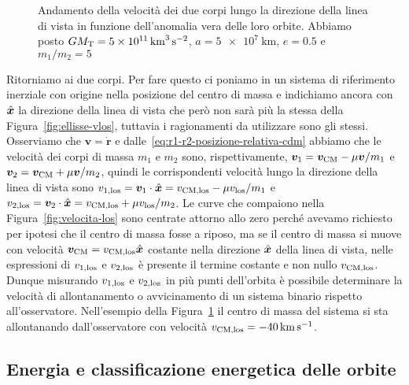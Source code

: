 {\begin{figure}
  \centering
  
  \caption[Andamento della velocità dei due corpi nella direzione della di vista
  in funzione dell'anomalia
  vera]{Andamento della velocità dei due corpi lungo la direzione della linea di
    vista in funzione dell'anomalia vera delle loro orbite. Abbiamo posto
    $GM_\textup{T} = \SI{5e11}{\cubic\kilo\metre\per\square\second}$,
    $a = \SI{5e7}{\kilo\metre}$, $e=0.5$ e $m_1/m_2=5$}
  \label{fig:velocita-los-due-corpi}
\end{figure}
Ritorniamo ai due corpi. Per fare questo ci poniamo in un sistema di riferimento
inerziale con origine nella posizione del centro di massa e indichiamo ancora
con $\hat{\bm{x}}$ la direzione della linea di vista che però non sarà più la
stessa della Figura~\ref{fig:ellisse-vlos}, tuttavia i ragionamenti da
utilizzare sono gli stessi. Osserviamo che $\bm{v}=\dot{\bm{r}}$ e
dalle~\eqref{eq:r1-r2-posizione-relativa-cdm} abbiamo che le velocità dei corpi
di massa $m_1$ e $m_2$ sono, rispettivamente,
$\bm{v}_1 = \bm{v}_\textup{CM}-\mu\bm{v}/m_1$ e
$\bm{v}_2 = \bm{v}_\textup{CM} + \mu\bm{v}/m_2$, quindi le corrispondenti
velocità lungo la direzione della linea di vista sono
$v_{1,\textup{los}} = \bm{v}_1 \cdot \hat{\bm{x}} = v_\textup{CM,los}-\mu
v_\textup{los}/m_1$
e
$v_{2,\textup{los}} = \bm{v}_2 \cdot \hat{\bm{x}} = v_\textup{CM,los} + \mu
v_\textup{los}/m_2$.
Le curve che compaiono nella Figura~\ref{fig:velocita-los} sono centrate attorno
allo zero perché avevamo richiesto per ipotesi che il centro di massa fosse a
riposo, ma se il centro di massa si muove con velocità
$\bm{v}_\textup{CM} = v_\textup{CM,los}\hat{\bm{x}}$ costante nella direzione
$\hat{\bm{x}}$ della linea di vista, nelle espressioni di $v_{1,\textup{los}}$ e
$v_{2,\textup{los}}$ è presente il termine costante e non nullo
$v_\textup{CM,los}$. Dunque misurando $v_{1,\textup{los}}$ e
$v_{2,\textup{los}}$ in più punti dell'orbita è possibile determinare la
velocità di allontanamento o avvicinamento di un sistema binario rispetto
all'osservatore. Nell'esempio della Figura~\ref{fig:velocita-los-due-corpi} il
centro di massa del sistema si sta allontanando dall'osservatore con velocità
$v_\textup{CM,los} = \SI{-40}{\kilo\metre\per\second}$.

\subsection{Energia e classificazione energetica delle orbite}
\label{sec:energia-orbite}

}
